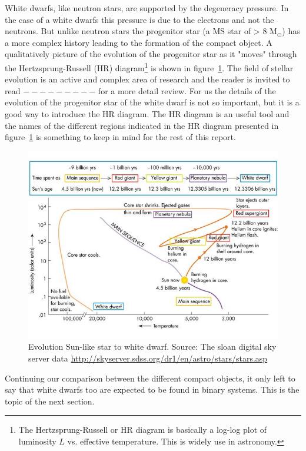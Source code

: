 White dwarfs, like neutron stars, are supported by the degeneracy pressure. In the case of a white dwarfs this pressure is due to the electrons and not the neutrons. But unlike neutron stars the progenitor star (a MS star of > 8 M$_\odot$) has a more complex history leading to the formation of the compact object. A qualitatively picture of the evolution of the progenitor star as it "moves" through the Hertzsprung-Russell (HR) diagram\footnote{ The Hertzsprung-Russell or HR diagram is basically a log-log plot of luminosity $L$ vs. effective temperature. This is widely use in astronomy.} is shown in figure~\ref{fig:hrwd}. The field of stellar evolution is an active and complex area of research and the reader is invited to read $---------$ for a more detail review. For us the details of the evolution of the progenitor star of the white dwarf is not so important, but it is a good way to introduce the HR diagram. The HR diagram is an useful tool and the names of the different regions indicated in the HR diagram presented in figure~\ref{fig:hrwd} is something to keep in mind for the rest of this report.  

\begin{figure}[]
\includegraphics[scale=3]{assets/images/starevol.jpg}
\caption{Evolution Sun-like star to white dwarf. Source: The sloan digital sky server data \protect\url{http://skyserver.sdss.org/dr1/en/astro/stars/stars.asp}}
\label{fig:hrwd}
\end{figure}

Continuing our comparison between the different compact objects, it only left to say that white dwarfs too are expected to be found in binary systems. This is the topic of the next section.  


